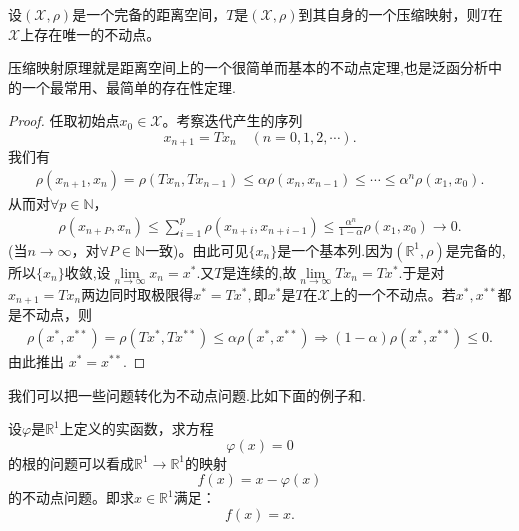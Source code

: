 \documentclass[../../main.tex]{subfiles}
\begin{document}
\begin{theorem}\label{theorem:Banach不动点定理——压缩映象原理}
设$(\mathscr{X},\rho)$是一个完备的距离空间，$T$是$(\mathscr{X},\rho)$到其自身的一个压缩映射，则$T$在$\mathscr{X}$上存在唯一的不动点。
\end{theorem}
\begin{note}
压缩映射原理就是距离空间上的一个很简单而基本的不动点定理,也是泛函分析中的一个最常用、最简单的存在性定理.
\end{note}
\begin{proof}
任取初始点$x_0 \in \mathscr{X}$。考察迭代产生的序列
$$x_{n+1} = Tx_n \quad (n = 0,1,2,\cdots).$$
我们有
\begin{align*}
\rho(x_{n+1}, x_n) = \rho(Tx_n, Tx_{n-1}) \leqslant \alpha \rho(x_n, x_{n-1}) \leqslant \cdots \leqslant \alpha^n \rho(x_1, x_0).
\end{align*}
从而对$\forall p \in \mathbb{N}$，
\begin{align*}
\rho(x_{n+P}, x_n) \leqslant \sum_{i=1}^p \rho(x_{n+i}, x_{n+i-1}) \leqslant \frac{\alpha^n}{1 - \alpha} \rho(x_1, x_0) \to 0.
\end{align*}
(当$n \to \infty$，对$\forall P \in \mathbb{N}$一致)。由此可见$\{x_n\}$是一个基本列.因为$(\mathbb{R}^1,\rho)$是完备的,所以$\{x_n\}$收敛,设$\underset{n\rightarrow \infty}{\lim}x_n=x^*.$又$T$是连续的,故$\underset{n\rightarrow \infty}{\lim}Tx_n=Tx^*.$于是对$x_{n+1} = Tx_n$两边同时取极限得$x^*=Tx^*,$即$x^*$是$T$在$\mathscr{X}$上的一个不动点。若$x^*, x^{**}$都是不动点，则
\begin{align*}
\rho \left( x^*,x^{**} \right) =\rho \left( Tx^*,Tx^{**} \right) \leqslant \alpha \rho \left( x^*,x^{**} \right) \Longrightarrow \left( 1-\alpha \right) \rho \left( x^*,x^{**} \right) \leqslant 0.
\end{align*}
由此推出
$x^* = x^{**}.$

\end{proof}
\begin{remark}
我们可以把一些问题转化为不动点问题.比如下面的例子和.

设$\varphi$是$\mathbb{R}^1$上定义的实函数，求方程
$$\varphi(x) = 0$$
的根的问题可以看成$\mathbb{R}^1 \to \mathbb{R}^1$的映射
$$f(x) = x - \varphi(x)$$
的不动点问题。即求$x \in \mathbb{R}^1$满足：
$$f(x) = x.$$
\end{remark}
\end{document}
